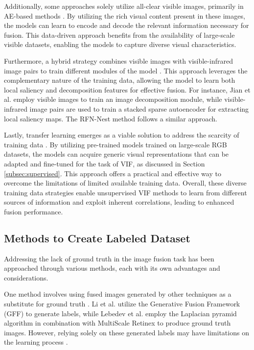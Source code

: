 Additionally, some approaches solely utilize all-clear visible images, primarily in AE-based methods \cite{li2019infrared}. By utilizing the rich visual content present in these images, the models can learn to encode and decode the relevant information necessary for fusion. This data-driven approach benefits from the availability of large-scale visible datasets, enabling the models to capture diverse visual characteristics.

Furthermore, a hybrid strategy combines visible images with visible-infrared image pairs to train different modules of the model \cite{jian2021infrared}. This approach leverages the complementary nature of the training data, allowing the model to learn both local saliency and decomposition features for effective fusion. For instance, Jian et al. \cite{li2021rfn} employ visible images to train an image decomposition module, while visible-infrared image pairs are used to train a stacked sparse autoencoder for extracting local saliency maps. The RFN-Nest method \cite{li2021rfn} follows a similar approach.

Lastly, transfer learning emerges as a viable solution to address the scarcity of training data \cite{transferlearning}. By utilizing pre-trained models trained on large-scale RGB datasets, the models can acquire generic visual representations that can be adapted and fine-tuned for the task of VIF, as discussed in Section \ref{subsec:supervised}. This approach offers a practical and effective way to overcome the limitations of limited available training data. Overall, these diverse training data strategies enable unsupervised VIF methods to learn from different sources of information and exploit inherent correlations, leading to enhanced fusion performance.

\subsection{Methods to Create Labeled Dataset}

Addressing the lack of ground truth in the image fusion task has been approached through various methods, each with its own advantages and considerations.

One method involves using fused images generated by other techniques as a substitute for ground truth \cite{li2019coupled, lebedev2019multisensor}. Li et al. \cite{li2019coupled} utilize the Generative Fusion Framework (GFF) \cite{li2013image} to generate labels, while Lebedev et al. \cite{lebedev2019multisensor} employ the Laplacian pyramid algorithm in combination with MultiScale Retinex \cite{petro2014multiscale} to produce ground truth images. However, relying solely on these generated labels may have limitations on the learning process \cite{ma2020ganmcc}.

